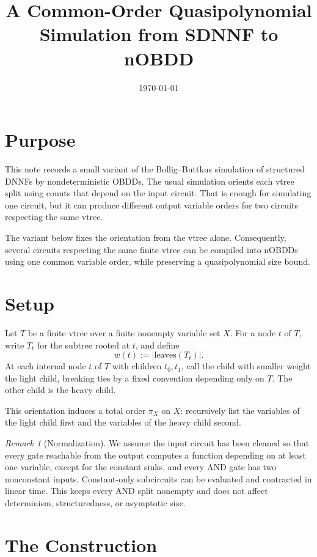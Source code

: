 \documentclass[11pt]{article}
\title{A Common-Order Quasipolynomial Simulation from SDNNF to nOBDD}
\author{}
\date{\today}
\theoremstyle{plain}
\theoremstyle{definition}
\theoremstyle{remark}
\newtheorem{remark}[theorem]{Remark}
\begin{document}
\maketitle

\section{Purpose}

This note records a small variant of the Bollig--Buttkus simulation of structured
DNNFs by nondeterministic OBDDs.  The usual simulation orients each vtree split
using counts that depend on the input circuit.  That is enough for simulating one
circuit, but it can produce different output variable orders for two circuits
respecting the same vtree.

The variant below fixes the orientation from the vtree alone.  Consequently,
several circuits respecting the same finite vtree can be compiled into
nOBDDs using one common variable order, while preserving a quasipolynomial size
bound.

\section{Setup}

Let $T$ be a finite vtree over a finite nonempty variable set $X$.  For a node
$t$ of $T$, write $T_t$ for the subtree rooted at $t$, and define
\[
  w(t) := |\text{leaves}(T_t)|.
\]
At each internal node $t$ of $T$ with children $t_0,t_1$, call the child with
smaller weight the light child, breaking ties by a fixed convention depending
only on $T$.  The other child is the heavy child.

This orientation induces a total order $\pi_X$ on $X$: recursively list the
variables of the light child first and the variables of the heavy child second.

\begin{remark}[Normalization]
We assume the input circuit has been cleaned so that every gate reachable from
the output computes a function depending on at least one variable, except for the
constant sinks, and every AND gate has two nonconstant inputs.  Constant-only
subcircuits can be evaluated and contracted in linear time.  This keeps every
AND split nonempty and does not affect determinism, structuredness, or
asymptotic size.
\end{remark}

\section{The Construction}
\end{document}
